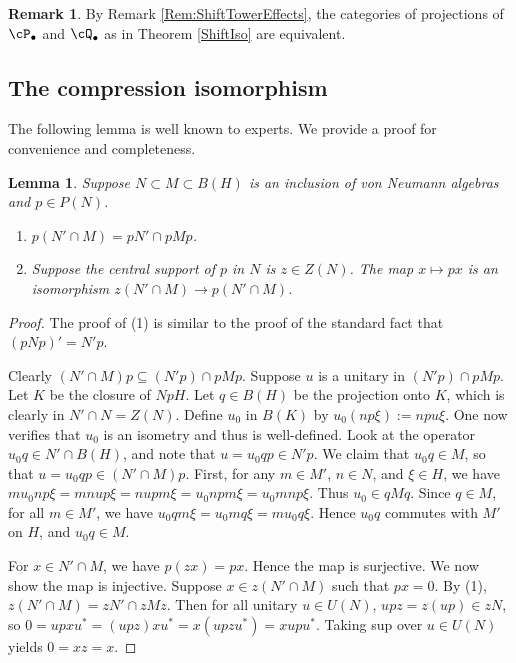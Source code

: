 \documentclass[11pt]{article}
\theoremstyle{plain}
\newtheorem{lem}[thm]{Lemma}
\theoremstyle{definition}
\newtheorem{rem}[thm]{Remark}
\begin{document}
\begin{rem}
By Remark \ref{Rem:ShiftTowerEffects}, the categories of projections of $\cP_\bullet$ and $\cQ_\bullet$ as in Theorem \ref{ShiftIso} are equivalent.
\end{rem}

\subsection{The compression isomorphism}
\label{sec:CompressionIso}

The following lemma is well known to experts. 
We provide a proof for convenience and completeness.

\begin{lem}
\label{lem:CompressRelativeCommutant}
Suppose $N\subset M\subset B(H)$ is an inclusion of von Neumann algebras and $p\in P(N)$.
\begin{enumerate}[label={\rm(\arabic*)}]
\item
$p(N'\cap M) = pN' \cap pMp$.
\item
Suppose the central support of $p$ in $N$ is $z\in Z(N)$.
The map $x\mapsto px$ is an isomorphism $z(N'\cap M) \to p(N'\cap M)$.
\end{enumerate}
\end{lem}
\begin{proof}
\mbox{}
\item[\underline{Proof of (1):}]
The proof of (1) is similar to the proof of the standard fact that $(pNp)' = N'p$.

Clearly $(N'\cap M)p \subseteq (N'p) \cap pMp$.
Suppose $u$ is a unitary in $(N'p) \cap pMp$.
Let $K$ be the closure of $NpH$.
Let $q\in B(H)$ be the projection onto $K$, which is clearly in $N' \cap N = Z(N)$.
Define $u_0$ in $B(K)$ by $u_0 (np\xi) := npu\xi$.
One now verifies that $u_0$ is an isometry and thus is well-defined.
Look at the operator $u_0q \in N' \cap B(H)$, and note that $u = u_0qp \in N'p$.
We claim that $u_0q \in M$, so that $u = u_0qp \in (N' \cap M)p$.
First, for any $m \in M'$, $n \in N$, and $\xi\in H$,
we have
$mu_0np\xi  = mnup\xi = nupm\xi = u_0npm\xi = u_0mnp\xi$.
Thus $u_0 \in qMq$.
Since $q \in M$, for all $m \in M'$, we have $u_0qm\xi = u_0mq\xi = mu_0q\xi$.
Hence $u_0q$ commutes with $M'$ on $H$, and $u_0q \in M$. 

\item[\underline{Proof of (2):}]
For $x\in N'\cap M$, we have $p(zx) = px$.
Hence the map is surjective.
We now show the map is injective.
Suppose $x \in z(N'\cap M)$ such that $px = 0$.
By (1), $z(N'\cap M) = zN' \cap zMz$.
Then for all unitary $u\in U(N)$, $upz = z(up) \in zN$, so 
$0 = upxu^* = (upz)xu^* = x(upzu^*) = xupu^*$.
Taking sup over $u \in U(N)$ yields $0 = xz = x$.
\end{proof}
\end{document}
